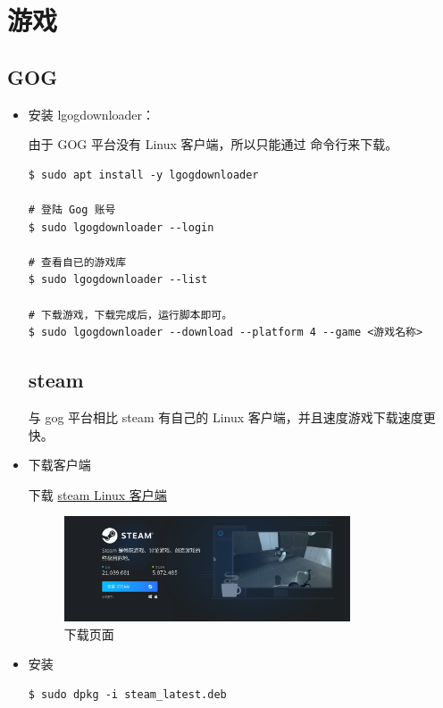 \chapter{游戏}

\section{GOG}
\begin{itemize}
\item 安装 lgogdownloader：

由于 GOG 平台没有 Linux 客户端，所以只能通过 命令行来下载。

\begin{lstlisting}
$ sudo apt install -y lgogdownloader

# 登陆 Gog 账号
$ sudo lgogdownloader --login 

# 查看自已的游戏库
$ sudo lgogdownloader --list

# 下载游戏，下载完成后，运行脚本即可。
$ sudo lgogdownloader --download --platform 4 --game <游戏名称>
\end{lstlisting}
\newpage

\section{steam}

与 gog 平台相比 steam 有自己的 Linux 客户端，并且速度游戏下载速度更快。

\item 下载客户端

下载 \href{https://store.steampowered.com/about/}{steam Linux 客户端} 

\begin{figure}[hbt!]  
	\centering
	\includegraphics[width=0.8\textwidth]{./img/game/steam.png}
	\caption{下载页面} %
	\label{fig:steam} %
\end{figure}

\item 安装
\begin{lstlisting}
$ sudo dpkg -i steam_latest.deb
\end{lstlisting}

\end{itemize}
